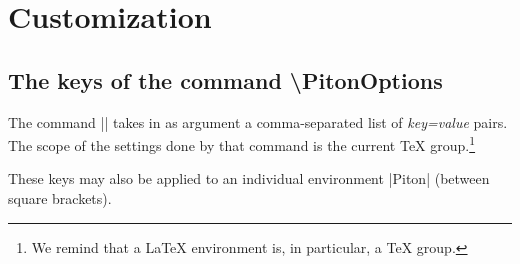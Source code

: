 \documentclass{article}
\begin{document}
\section{Customization}


\subsection{The keys of the command \textbackslash PitonOptions}



The command |\PitonOptions| takes in as argument a comma-separated list of
\textsl{key=value} pairs. The scope of the settings done by that command is
the current TeX group.\footnote{We remind that a LaTeX environment is, in
particular, a TeX group.}

These keys may also be applied to an individual environment |{Piton}| (between
square brackets).
\end{document}
